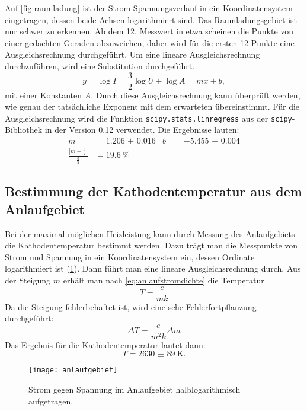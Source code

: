 Auf \cref{fig:raumladung} ist der Strom-Spannungsverlauf in ein
Koordinatensystem eingetragen, dessen beide Achsen logarithmiert
sind. Das Raumladungsgebiet ist nur schwer zu erkennen. Ab dem
12. Messwert in etwa scheinen die Punkte von einer gedachten Geraden
abzuweichen, daher wird für die ersten 12 Punkte eine Ausgleichsrechnung
durchgeführt. Um eine lineare Ausgleichsrechnung durchzuführen, wird eine
Substitution durchgeführt.
%
\begin{equation*}
  y = \log I = \frac{3}{2} \log U + \log A = m x + b,
\end{equation*}
%
mit einer Konstanten $A$. Durch diese Ausgleichsrechnung kann überprüft
werden, wie genau der tatsächliche Exponent mit dem erwarteten
übereinstimmt. Für die Ausgleichsrechnung wird die Funktion
\texttt{scipy.stats.linregress} aus der \texttt{scipy}-Bibliothek in der
Version 0.12 verwendet. Die Ergebnisse lauten:
%
\begin{align*}
  m &= \num{1.206(16)} &
  b &= \num{-5.455(4)}\\
  \frac{|m - \frac{3}{2}|}{\frac{3}{2}} &= \SI{19.6}{\percent}
\end{align*}

\subsection{Bestimmung der Kathodentemperatur aus dem Anlaufgebiet}

Bei der maximal möglichen Heizleistung kann durch Messung des
Anlaufgebiets die Kathodentemperatur bestimmt werden. Dazu trägt man die
Messpunkte von Strom und Spannung in ein Koordinatensystem ein, dessen
Ordinate logarithmiert ist (\cref{fig:anlaufgebiet}). Dann führt man
eine lineare Ausgleichsrechnung durch. Aus der Steigung $m$ erhält man
nach \cref{eq:anlaufstromdichte} die Temperatur
%
\begin{equation*}
  T = \frac{e}{m k}
\end{equation*}
Da die Steigung fehlerbehaftet ist, wird eine sche
Fehlerfortpflanzung durchgeführt:
%
\begin{equation*}
  \Delta T = \frac{e}{m^2k} \Delta m
\end{equation*}
%
Das Ergebnis für die Kathodentemperatur lautet dann:
%
\begin{equation*}
  T = \SI{2630(89)}{\kelvin}.
\end{equation*}

\begin{figure}
  \centering
  \texttt{[image: anlaufgebiet]}
  \caption{Strom gegen Spannung im Anlaufgebiet halblogarithmisch
    aufgetragen.}
  \label{fig:anlaufgebiet}
\end{figure}

